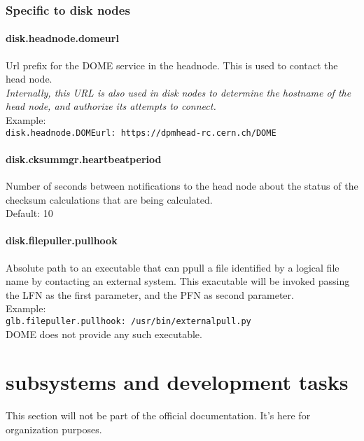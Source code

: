 \documentclass[a4paper,10pt]{scrreprt}
\begin{document}
\subsection{Specific to disk nodes}

\subsubsection{disk.headnode.domeurl}
Url prefix for the DOME service in the headnode. This is used to contact the head node.\\

\textit{Internally, this URL is also used in disk nodes to determine the hostname of the head node, and authorize its attempts to connect.}\\

Example:\\
\lstinline"disk.headnode.DOMEurl: https://dpmhead-rc.cern.ch/DOME"\\

\subsubsection{disk.cksummgr.heartbeatperiod}
Number of seconds between notifications to the head node about the status of the checksum calculations that are being calculated.\\
Default: 10\\


\subsubsection{disk.filepuller.pullhook}

Absolute path to an executable that can ppull a file identified by a logical file name by contacting an external system. This exacutable
will be invoked passing the LFN as the first parameter, and the PFN as second parameter.\\

Example:\\
\lstinline"glb.filepuller.pullhook: /usr/bin/externalpull.py"\\

DOME does not provide any such executable.\\

\chapter{subsystems and development tasks}
This section will not be part of the official documentation. It's here for organization purposes.\\
\end{document}
